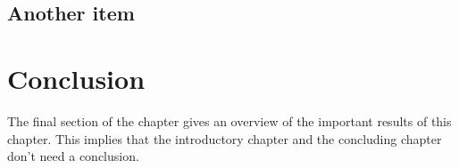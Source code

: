 \subsection{Another item}


\section{Conclusion}
The final section of the chapter gives an overview of the important results
of this chapter. This implies that the introductory chapter and the
concluding chapter don't need a conclusion.


